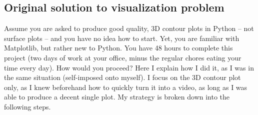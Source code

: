 \documentclass[oneside,10pt]{book}
\begin{document}
\subsection{Original solution to visualization problem}\label{vesurine}


Assume you are asked to produce good quality, 3D contour plots in Python -- not surface plots -- and you have no idea how to start. Yet, you are familiar with Matplotlib, but rather new to Python. You have 48 hours to complete this project (two days of work at your office, minus the regular chores eating your time every day). How would you proceed? Here I explain how I did it, as I was in the same situation (self-imposed onto myself). I focus on the 3D contour plot only, as I knew beforehand how to quickly turn it into a video, as long as I was able to produce a decent single plot. My strategy is broken down into the following steps. \vspace{1ex}
\end{document}
